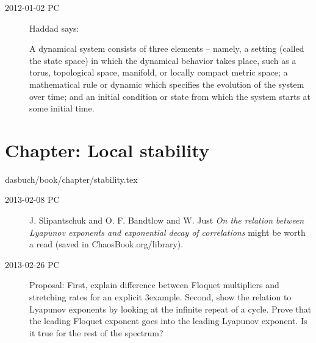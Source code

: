 \begin{description}

\item[2012-01-02 PC]
Haddad says:                     \toCB

A dynamical system consists of three elements -- namely, a setting (called
the state space) in which the dynamical behavior takes place, such as a
torus, topological space, manifold, or locally compact metric space; a
mathematical rule or dynamic which specifies the evolution of the system
over time; and an initial condition or state from which the system starts
at some initial time.

\end{description}


%
%

\section{Chapter: Local stability}
\label{c-stability}\noindent dasbuch/book/chapter/stability.tex
\begin{description}

\item[2013-02-08 PC]
J. Slipantschuk and O. F. Bandtlow and W. Just
{\em On the relation between Lyapunov exponents and exponential decay
of correlations} might be worth a read (saved in
ChaosBook.org/library).

\item[2013-02-26 PC]                \toCB
Proposal: First, explain difference between Floquet multipliers and
stretching rates for an explicit 3\dmn example. Second, show the
relation to Lyapunov exponents by looking at the infinite repeat of a
cycle. Prove that the leading Floquet exponent goes into the leading
Lyapunov exponent. Is it true for the rest of the spectrum?


\end{description}


